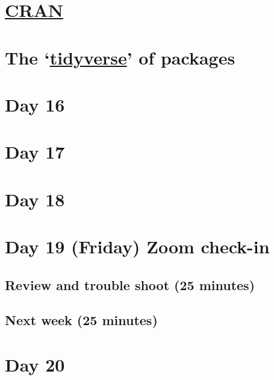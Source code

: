 \documentclass[]{book}
\begin{document}
\hypertarget{cran}{%
\section{\texorpdfstring{\href{https://cran.r-project.org}{CRAN}}{CRAN}}\label{cran}}

\hypertarget{the-tidyverse-of-packages}{%
\section{\texorpdfstring{The `\href{https://www.tidyverse.org/}{tidyverse}' of packages}{The `tidyverse' of packages}}\label{the-tidyverse-of-packages}}

\hypertarget{day-16}{%
\section{Day 16}\label{day-16}}

\hypertarget{day-17}{%
\section{Day 17}\label{day-17}}

\hypertarget{day-18}{%
\section{Day 18}\label{day-18}}

\hypertarget{day-19-friday-zoom-check-in}{%
\section{Day 19 (Friday) Zoom check-in}\label{day-19-friday-zoom-check-in}}

\hypertarget{review-and-trouble-shoot-25-minutes}{%
\subsection{Review and trouble shoot (25 minutes)}\label{review-and-trouble-shoot-25-minutes}}

\hypertarget{next-week-25-minutes}{%
\subsection{Next week (25 minutes)}\label{next-week-25-minutes}}

\hypertarget{day-20}{%
\section{Day 20}\label{day-20}}
\end{document}
